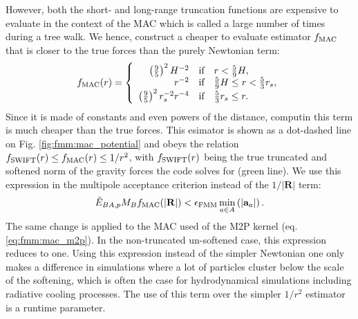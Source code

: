 However, both the short- and long-range truncation functions are
expensive to evaluate in the context of the MAC which is called a
large number of times during a tree walk. We hence, construct a
cheaper to evaluate estimator $f_{\rm MAC}$ that is closer to the true
forces than the purely Newtonian term:
\begin{align}
f_{\rm MAC}(r) =
\left\lbrace\begin{array}{rcl}
  \left(\frac{9}{5}\right)^2 H^{-2} & \mbox{if} & r <
  \frac{5}{9}H,\\
  r^{-2} & \mbox{if} & \frac{5}{9}H \leq r < \frac{5}{3}r_s, \\
  \left(\frac{9}{5}\right)^2 r_s^{-2} r^{-4} & \mbox{if} & \frac{5}{3}r_s \leq r. \\
\end{array}
\right.
\label{eq:fmm:f_mac}
\end{align}
Since it is made of constants and even powers of the distance,
computin this term is much cheaper than the true forces.  This
esimator is shown as a dot-dashed line on
Fig. \ref{fig:fmm:mac_potential} and obeys the relation $f_{\rm
  SWIFT}(r) \leq f_{\rm MAC}(r) \leq 1/r^2$, with $f_{\rm SWIFT}(r)$
being the true truncated and softened norm of the gravity forces the
code solves for (green line). We use this expression in the multipole
acceptance criterion instead of the $1/|\mathbf{R}|$ term:
\begin{equation}
  \tilde{E}_{BA,p} M_Bf_{\rm MAC}(|\mathbf{R}|) < \epsilon_{\rm FMM} \min_{a\in
    A}\left(|\mathbf{a}_a|\right).
  \label{eq:fmm:mac_f_mac}  
\end{equation}
The same change is applied to the MAC used of the M2P kernel
(eq. \ref{eq:fmm:mac_m2p}). In the non-truncated un-softened case, this
expression reduces to \citep{Dehnen2014} one. Using this expression
instead of the simpler Newtonian one only makes a difference in
simulations where a lot of particles cluster below the scale of the
softening, which is often the case for hydrodynamical simulations
including radiative cooling processes. The use of this term over the
simpler $1/r^2$ estimator is a runtime parameter.


